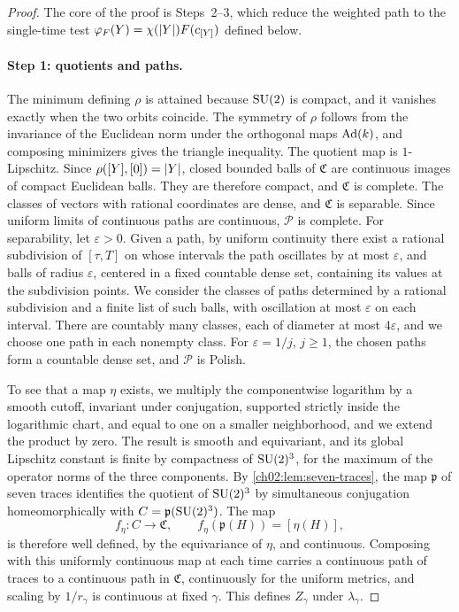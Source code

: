 \begin{proof}
The core of the proof is Steps~2--3, which reduce the weighted path to the single-time test $\varphi_F(Y)=\chi(\lvert Y\rvert)F(c_{[Y]})$ defined below.

\paragraph{Step 1: quotients and paths.}
The minimum defining $\rho$ is attained because $\mathrm{SU}(2)$ is compact, and it vanishes exactly when the two orbits coincide. The symmetry of $\rho$ follows from the invariance of the Euclidean norm under the orthogonal maps $\operatorname{Ad}(k)$, and composing minimizers gives the triangle inequality. The quotient map is $1$-Lipschitz. Since $\rho([Y],[0])=\lvert Y\rvert$, closed bounded balls of $\mathfrak C$ are continuous images of compact Euclidean balls. They are therefore compact, and $\mathfrak C$ is complete. The classes of vectors with rational coordinates are dense, and $\mathfrak C$ is separable. Since uniform limits of continuous paths are continuous, $\mathscr P$ is complete. For separability, let $\varepsilon>0$. Given a path, by uniform continuity there exist a rational subdivision of $[\tau,T]$ on whose intervals the path oscillates by at most $\varepsilon$, and balls of radius $\varepsilon$, centered in a fixed countable dense set, containing its values at the subdivision points. We consider the classes of paths determined by a rational subdivision and a finite list of such balls, with oscillation at most $\varepsilon$ on each interval. There are countably many classes, each of diameter at most $4\varepsilon$, and we choose one path in each nonempty class. For $\varepsilon=1/j$, $j\ge1$, the chosen paths form a countable dense set, and $\mathscr P$ is Polish.

To see that a map $\eta$ exists, we multiply the componentwise logarithm by a smooth cutoff, invariant under conjugation, supported strictly inside the logarithmic chart, and equal to one on a smaller neighborhood, and we extend the product by zero. The result is smooth and equivariant, and its global Lipschitz constant is finite by compactness of $\mathrm{SU}(2)^3$, for the maximum of the operator norms of the three components. By \cref{ch02:lem:seven-traces}, the map $\mathfrak p$ of seven traces identifies the quotient of $\mathrm{SU}(2)^3$ by simultaneous conjugation homeomorphically with $C=\mathfrak p(\mathrm{SU}(2)^3)$. The map
\[
 f_\eta:C\to\mathfrak C,\qquad f_\eta(\mathfrak p(H))=[\eta(H)],
\]
is therefore well defined, by the equivariance of $\eta$, and continuous. Composing with this uniformly continuous map at each time carries a continuous path of traces to a continuous path in $\mathfrak C$, continuously for the uniform metrics, and scaling by $1/r_\gamma$ is continuous at fixed $\gamma$. This defines $Z_\gamma$ under $\lambda_\gamma$.


\end{proof}
